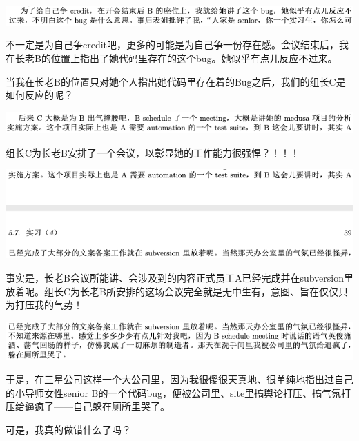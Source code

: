 \documentclass[9pt, b5paper]{article}
\begin{document}
\begin{center}
\includegraphics[width=.9\linewidth]{./pic/backups_plans_20210505_130526.png}
\end{center}

不一定是为自己争credit吧，更多的可能是为自己争一份存在感。会议结束后，我在长老B的位置上指出了她代码里存在的这个bug。她似乎有点儿反应不过来。 

当我在长老B的位置只对她个人指出她代码里存在着的Bug之后，我们的组长C是如何反应的呢？

\begin{center}
\includegraphics[width=.9\linewidth]{./pic/backups_plans_20210505_131253.png}
\end{center}

组长C为长老B安排了一个会议，以彰显她的工作能力很强悍？！！！

\begin{center}
\includegraphics[width=.9\linewidth]{./pic/backups_plans_20210505_131636.png}
\end{center}

事实是，长老B会议所能讲、会涉及到的内容正式员工A已经完成并在subversion里放着呢。组长C为长老B所安排的这场会议完全就是无中生有，意图、旨在仅仅只为打压我的气势！

\begin{center}
\includegraphics[width=.9\linewidth]{./pic/backups_plans_20210504_231406.png}
\end{center}

于是，在三星公司这样一个大公司里，因为我很傻很天真地、很单纯地指出过自己的小导师女性senior B的一个代码bug，便被公司里、site里搞舆论打压、搞气氛打压给逼疯了——自己躲在厕所里哭了。 

可是，我真的做错什么了吗？
\end{document}
